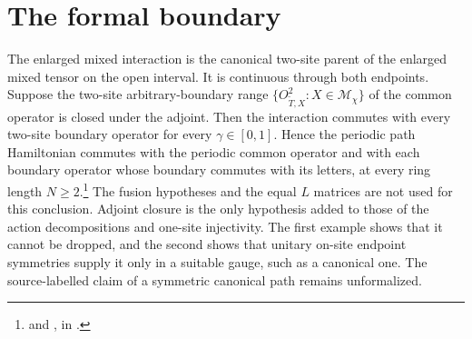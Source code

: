 \documentclass{article}
\begin{document}
\section{The formal boundary}
The enlarged mixed interaction is the canonical two-site parent of the
enlarged mixed tensor on the open interval. It is continuous through both
endpoints. Suppose the two-site arbitrary-boundary range
$\{O^2_{\widetilde T,X}:X\in\mathcal M_\chi\}$ of the common operator is
closed under the adjoint. Then the interaction commutes with every
two-site boundary operator for every $\gamma\in[0,1]$. Hence the periodic
path Hamiltonian commutes with the periodic common operator and with each
boundary operator whose boundary commutes with its letters, at every ring
length $N\geq2$.\footnote{
    and
    ,
    in .}
The fusion hypotheses and the equal $L$ matrices are not used for this
conclusion. Adjoint closure is the only hypothesis added to those of the
action decompositions and one-site injectivity. The first example shows
that it cannot be dropped, and the second shows that unitary on-site
endpoint symmetries supply it only in a suitable gauge, such as a
canonical one. The source-labelled claim of a
symmetric canonical path remains unformalized.
\end{document}
